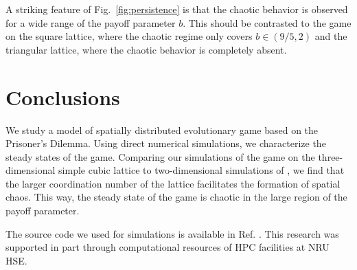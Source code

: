 \documentclass[a4paper]{jpconf}
\begin{document}
A striking feature of Fig.\ \ref{fig:persistence} is that the chaotic behavior is observed for a wide range of the payoff parameter $b$. This should be contrasted to the game on the square lattice, where the chaotic regime only covers $b\in (9/5, 2)$ and the triangular lattice, where the chaotic behavior is completely absent.


\section{Conclusions}

We study a model of spatially distributed evolutionary game based on the Prisoner's Dilemma. Using direct numerical simulations, we characterize the steady states of the game. Comparing our simulations of the game on the three-dimensional simple cubic lattice to two-dimensional simulations of \cite{Nowak1992, Nowak1993, Kolotev2018}, we find that the larger coordination number of the lattice facilitates the formation of spatial chaos. This way, the steady state of the game is chaotic in the large region of the payoff parameter.

The source code we used for simulations is available in Ref. \cite{github}. 
This research was supported in part through computational resources of HPC facilities at NRU HSE.
\end{document}
